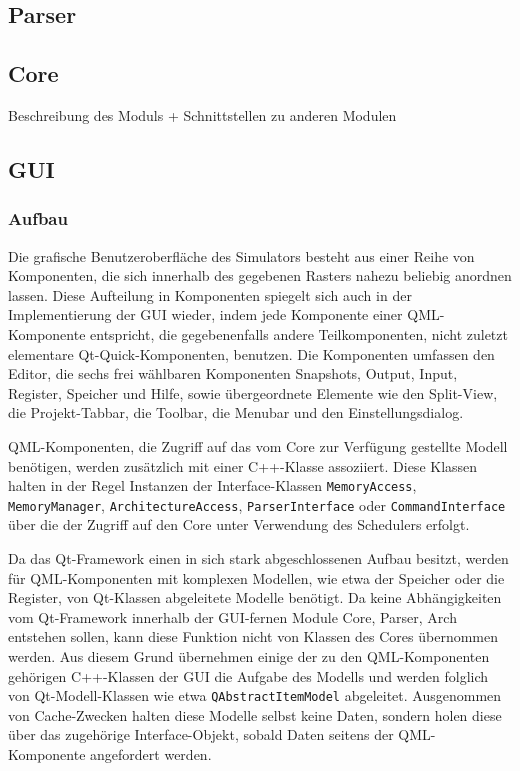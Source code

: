 

\subsection{Parser}

\subsection{Core}

Beschreibung des Moduls + Schnittstellen zu anderen Modulen

\subsection{GUI}


\subsubsection{Aufbau}

Die grafische Benutzeroberfläche des Simulators besteht aus einer Reihe von Komponenten, die sich innerhalb des gegebenen Rasters nahezu beliebig anordnen lassen. Diese Aufteilung in Komponenten spiegelt sich auch in der Implementierung der GUI wieder, indem jede Komponente einer QML-Komponente entspricht, die gegebenenfalls andere Teilkomponenten, nicht zuletzt elementare Qt-Quick-Komponenten, benutzen. Die Komponenten umfassen den Editor, die sechs frei wählbaren Komponenten Snapshots, Output, Input, Register, Speicher und Hilfe, sowie übergeordnete Elemente wie den Split-View, die Projekt-Tabbar, die Toolbar, die Menubar und den Einstellungsdialog.

QML-Komponenten, die Zugriff auf das vom Core zur Verfügung gestellte Modell benötigen, werden zusätzlich mit einer C++-Klasse assoziiert. Diese Klassen halten in der Regel Instanzen der Interface-Klassen \texttt{MemoryAccess}, \texttt{MemoryManager}, \texttt{ArchitectureAccess}, \texttt{ParserInterface} oder \texttt{CommandInterface}  über die der Zugriff auf den Core unter Verwendung des Schedulers erfolgt.

Da das Qt-Framework einen in sich stark abgeschlossenen Aufbau besitzt, werden für QML-Komponenten mit komplexen Modellen, wie etwa der Speicher oder die Register, von Qt-Klassen abgeleitete Modelle benötigt. Da keine Abhängigkeiten vom Qt-Framework innerhalb der GUI-fernen Module Core, Parser, Arch entstehen sollen, kann diese Funktion nicht von Klassen des Cores übernommen werden. Aus diesem Grund übernehmen einige der zu den QML-Komponenten gehörigen C++-Klassen der GUI die Aufgabe des Modells und werden folglich von Qt-Modell-Klassen wie etwa \texttt{QAbstractItemModel} abgeleitet. Ausgenommen von Cache-Zwecken halten diese Modelle selbst keine Daten, sondern holen diese über das zugehörige Interface-Objekt, sobald Daten seitens der QML-Komponente angefordert werden.

